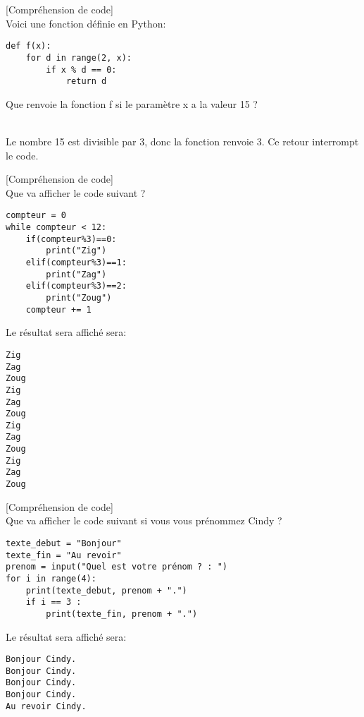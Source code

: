 \documentclass[a4paper,12pt]{article}
\begin{document}
\exo{}[Compréhension de code]  ~\\ 
Voici une fonction définie en Python:
\begin{lstlisting}
def f(x):
    for d in range(2, x):
        if x % d == 0:
            return d
\end{lstlisting}
Que renvoie la fonction f si le paramètre x a la valeur 15 ?
\begin{correction}
		~\\ \vspace{-5pt}
		Le nombre 15 est divisible par 3, donc la fonction renvoie 3. Ce retour interrompt le code.
\end{correction}
\finexo
\exo{}[Compréhension de code]  ~\\ 
Que va afficher le code suivant ?
\begin{lstlisting}
compteur = 0
while compteur < 12:
    if(compteur%3)==0:
        print("Zig")
    elif(compteur%3)==1:
        print("Zag")
    elif(compteur%3)==2:
        print("Zoug")
    compteur += 1
\end{lstlisting}
\begin{correction}
Le résultat sera affiché sera:
\begin{lstlisting}
Zig
Zag
Zoug
Zig
Zag
Zoug
Zig
Zag
Zoug
Zig
Zag
Zoug
\end{lstlisting}
\end{correction}
\finexo
\exo{}[Compréhension de code]  ~\\ 
Que va afficher le code suivant si vous vous prénommez Cindy ?
\begin{lstlisting}
texte_debut = "Bonjour"
texte_fin = "Au revoir"
prenom = input("Quel est votre prénom ? : ")
for i in range(4):
    print(texte_debut, prenom + ".")
    if i == 3 :
        print(texte_fin, prenom + ".")
\end{lstlisting}
\begin{correction}
Le résultat sera affiché sera:
\begin{lstlisting}
Bonjour Cindy.
Bonjour Cindy.
Bonjour Cindy.
Bonjour Cindy.
Au revoir Cindy.
\end{lstlisting}
	\end{correction}
\end{document}
